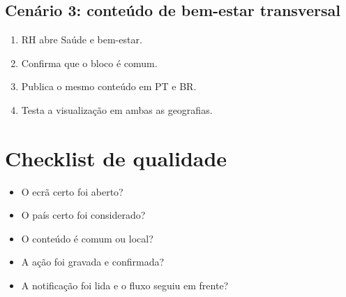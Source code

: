 \section{Cenário 3: conteúdo de bem-estar transversal}
\begin{enumerate}
  \item RH abre Saúde e bem-estar.
  \item Confirma que o bloco é comum.
  \item Publica o mesmo conteúdo em PT e BR.
  \item Testa a visualização em ambas as geografias.
\end{enumerate}

\chapter{Checklist de qualidade}
\begin{itemize}
  \item O ecrã certo foi aberto?
  \item O país certo foi considerado?
  \item O conteúdo é comum ou local?
  \item A ação foi gravada e confirmada?
  \item A notificação foi lida e o fluxo seguiu em frente?
\end{itemize}
